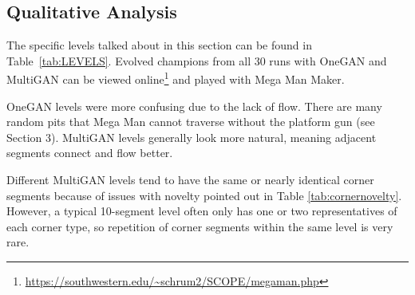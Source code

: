 \subsection{Qualitative Analysis}
\label{sec:levelapp}

The specific levels talked about in this section can be found in Table~\ref{tab:LEVELS}. Evolved champions from all 30 runs with OneGAN and MultiGAN can be viewed online\footnote{\url{https://southwestern.edu/~schrum2/SCOPE/megaman.php}} and played with Mega Man Maker.

 

OneGAN levels were more confusing due to the lack of flow. There are many random pits that Mega Man cannot traverse without the platform gun (see Section 3). MultiGAN levels generally look more natural, meaning adjacent segments connect and flow better. 




Different MultiGAN levels tend to have the same or nearly identical corner segments because of
issues with novelty pointed out in Table \ref{tab:cornernovelty}. However, a typical 10-segment level often only has one or two representatives of each corner type, so repetition of corner segments within the same level is very rare.









